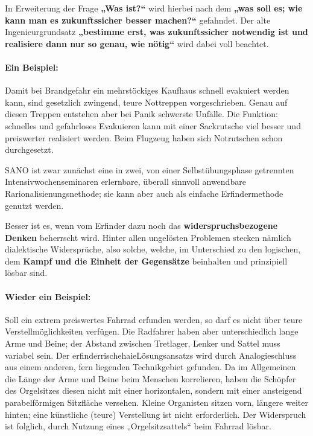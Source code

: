 \documentclass[11pt,a4paper]{article}
\begin{document}
In Erweiterung der Frage \textbf{„Was ist?“} wird hierbei nach dem
\textbf{„was soll es; wie kann man es zukunftssicher besser machen?“}
gefahndet.  Der alte Ingenieurgrundsatz \textbf{„bestimme erst, was
  zukunftssicher notwendig ist und realisiere dann nur so genau, wie nötig“}
wird dabei voll beachtet.

\paragraph{Ein Beispiel:}
Damit bei Brandgefahr ein mehrstöckiges Kaufhaus schnell evakuiert werden
kann, sind gesetzlich zwingend, teure Nottreppen vorgeschrieben.  Genau auf
diesen Treppen entstehen aber bei Panik schwerste Unfälle. Die Funktion:
schnelles und gefahrloses Evakuieren kann mit einer Sackrutsche viel besser
und preiswerter realisiert werden.  Beim Flugzeug haben sich Notrutschen
schon durchgesetzt.

SANO ist zwar zunächst eine in zwei, von einer Selbstübungsphase getrennten
Intensivwochenseminaren erlernbare, überall sinnvoll anwendbare
Rarionalisienungsnethode; sie kann aber auch als einfache Erfindermethode
genutzt werden.

Besser ist es, wenn vom Erfinder dazu noch das \textbf{widerspruchsbezogene
  Denken} beherrscht wird.  Hinter allen ungelösten Problemen stecken nämlich
dialektische Widersprüche, also solche, welche, im Unterschied zu den
logischen, dem \textbf{Kampf und die Einheit der Gegensätze} beinhalten und
prinzipiell lösbar sind.

\paragraph{Wieder ein Beispiel:}
Soll ein extrem preiswertes Fahrrad erfunden werden, so darf es nicht über
teure Verstellmöglichkeiten verfügen.  Die Radfahrer haben aber
unterschiedlich lange Arme und Beine; der Abstand zwischen Tretlager, Lenker
und Sattel muss variabel sein. Der erfinderrischehaieLösungsansatzs wird durch
Analogieschluss aus einem anderen, fern liegenden Technikgebiet gefunden.  Da
im Allgemeinen die Länge der Arme und Beine beim Menschen korrelieren, haben
die Schöpfer des Orgelsitzes diesen nicht mit einer horizontalen, sondern mit
einer ansteigend parabelförmigen Sitzfläche versehen.  Kleine Organisten
sitzen vorn, längere weiter hinten; eine künstliche (teure) Verstellung ist
nicht erforderlich. Der Widerspruch ist folglich, durch Nutzung eines
„Orgelsitzsattels“ beim Fahrrad lösbar.
\end{document}
